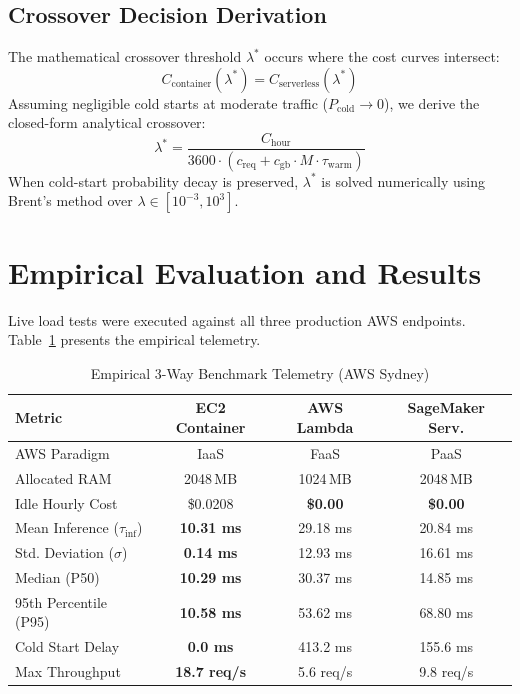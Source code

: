 \documentclass[conference]{IEEEtran}
\begin{document}
\subsection{Crossover Decision Derivation}
The mathematical crossover threshold $\lambda^*$ occurs where the cost curves intersect:
\begin{equation}
    C_{\text{container}}(\lambda^*) = C_{\text{serverless}}(\lambda^*)
\end{equation}
Assuming negligible cold starts at moderate traffic ($P_{\text{cold}} \to 0$), we derive the closed-form analytical crossover:
\begin{equation}
    \lambda^* = \frac{C_{\text{hour}}}{3600 \cdot \left( c_{\text{req}} + c_{\text{gb}} \cdot M \cdot \tau_{\text{warm}} \right)}
    \label{eq:crossover_closed}
\end{equation}
When cold-start probability decay is preserved, $\lambda^*$ is solved numerically using Brent's method over $\lambda \in [10^{-3}, 10^3]$.

\section{Empirical Evaluation and Results}
Live load tests were executed against all three production AWS endpoints. Table~\ref{tab:empirical_summary} presents the empirical telemetry.

\begin{table}[h]
\centering
\caption{Empirical 3-Way Benchmark Telemetry (AWS Sydney)}
\label{tab:empirical_summary}
\begin{tabular}{lccc}
\toprule
\textbf{Metric} & \textbf{EC2 Container} & \textbf{AWS Lambda} & \textbf{SageMaker Serv.} \\
\midrule
AWS Paradigm & IaaS & FaaS & PaaS \\
Allocated RAM & 2048\,MB & 1024\,MB & 2048\,MB \\
Idle Hourly Cost & \$0.0208 & \textbf{\$0.00} & \textbf{\$0.00} \\
\midrule
Mean Inference ($\tau_{\text{inf}}$) & \textbf{10.31 ms} & 29.18 ms & 20.84 ms \\
Std. Deviation ($\sigma$) & \textbf{0.14 ms} & 12.93 ms & 16.61 ms \\
Median (P50) & \textbf{10.29 ms} & 30.37 ms & 14.85 ms \\
95th Percentile (P95) & \textbf{10.58 ms} & 53.62 ms & 68.80 ms \\
\midrule
Cold Start Delay & \textbf{0.0 ms} & 413.2 ms & 155.6 ms \\
Max Throughput & \textbf{18.7 req/s} & 5.6 req/s & 9.8 req/s \\
\bottomrule
\end{tabular}
\end{table}
\end{document}
